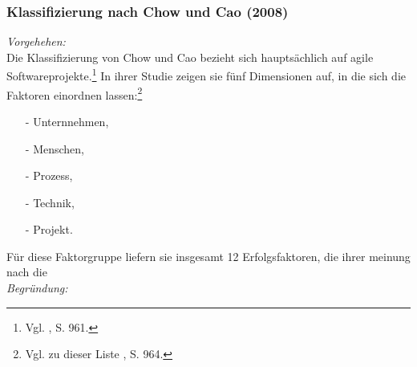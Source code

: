 \noindent
\subsubsection{Klassifizierung nach Chow und Cao (2008)}
\textit{Vorgehehen:}\\\noindent
Die Klassifizierung von Chow und Cao bezieht sich hauptsächlich auf agile Softwareprojekte.\footnote{Vgl. \cite{Chow.2008}, S. 961.}
In ihrer Studie zeigen sie fünf Dimensionen auf, in die sich die Faktoren einordnen lassen:\footnote{Vgl. zu dieser Liste \cite{Chow.2008}, S. 964.}
\begin{itemize}\itemsep0pt
\item[-]Unternnehmen,
\item[-]Menschen,
\item[-]Prozess,
\item[-]Technik,
\item[-]Projekt.
\end{itemize}
Für diese Faktorgruppe liefern sie insgesamt 12 Erfolgsfaktoren, die ihrer meinung nach die
\\\noindent
\textit{Begründung:}\\\noindent